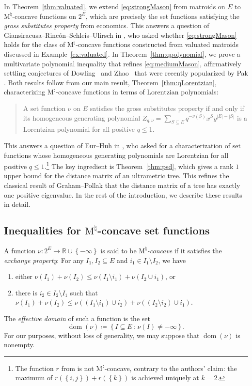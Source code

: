 \documentclass{amsart}
\theoremstyle{definition}
\theoremstyle{remark}
\newcommand{\abs}[1]{\left|#1\right|}               %
\newcommand{\set}[1]{\left\{#1\right\}}             %
\newcommand{\R}{\mathbb{R}}
\DeclareMathOperator{\dom}{{dom}}          %
\newcommand{\1}{\mathbf{1}}
\newcommand{\Mnat}{$\text{M}^\natural$}
\numberwithin{equation}{section}
\begin{document}
In Theorem~\ref{thm:valuated}, we extend \eqref{eq:strongMason} from matroids on $E$ to \Mnat-concave functions on $2^{E}$, which are precisely the set functions  
  satisfying the \emph{gross substitutes property} from economics. 
  This answers a question of  Giansiracusa--Rincón--Schleis--Ulirsch in \cite[Question 4.1]{GRSU24}, who asked whether \eqref{eq:strongMason} holds for the class of \Mnat-concave functions constructed from valuated matroids discussed in Example~\ref{ex:valuated}. 
  In Theorem~\ref{thm:qpolynomial},
  we prove a multivariate polynomial inequality that refines \eqref{eq:mediumMason}, affirmatively settling conjectures of Dowling~\cite{Do80} and Zhao~\cite{Zh85} that were recently popularized by Pak \cite{Pak24}.
Both results follow from our main result, Theorem~\ref{thm:qLorentzian}, characterizing \Mnat-concave functions in terms of Lorentzian polynomials:
\begin{quote}
A set function $\nu$ on $E$ satisfies the gross substitutes property if and only if its homogeneous generating polynomial $Z_{q,\nu} = \sum_{S \subseteq E} q^{-\nu(S)} x^S y^{\abs{E}-\abs{S}}$ is a Lorentzian polynomial for all positive $q \le 1$.
\end{quote}
This answers a question of Eur--Huh in \cite[Section 5.1]{EH20}, who asked for a characterization of set functions whose homogeneous generating polynomials are Lorentzian for all positive $q \le 1$.\footnote{The function $r$ from \cite[Example 5.4]{EH20} is  not \Mnat-concave, contrary to the authors' claim: the maximum of $r(\set{i,j})+r(\set{k})$ is achieved uniquely at $k=2$.}  
The key ingredient is Theorem~\ref{thm:psd}, which
gives a rank $1$ upper bound for the distance matrix of an ultrametric tree. This refines the classical result of Graham--Pollak that the distance matrix of a tree has exactly one positive eigenvalue.
In the rest of the introduction, we describe these results in detail.





\subsection{Inequalities for \Mnat-concave set functions}\label{sec:Mnat}

A  function $\nu \colon 2^{E} \to \R\cup\set{-\infty}$ is said to be \textit{\Mnat-concave} if it satisfies the \emph{exchange property}: For any $I_1, I_2 \subseteq E$ and $i_1 \in I_1\setminus I_2$, we have 
\begin{enumerate}[(1)]\itemsep 5pt
        \item either $\nu(I_1) + \nu(I_2) \leq \nu(I_1 \setminus i_1) +\nu(I_2 \cup i_1)$, or 
        \item there is $i_2\in I_2\setminus I_1$ such that $\nu(I_1)+\nu(I_2)\leq \nu((I_1\setminus i_1) \cup i_2)+\nu((I_2\setminus i_2) \cup i_1)$.
\end{enumerate}
The \emph{effective domain} of such a function is the set 
\[
\dom(\nu) \coloneqq \set{ I \subseteq {E} \, \colon \, \nu(I) \neq -\infty  }.
\]
For our purposes, without loss of generality, we may suppose that  $\dom(\nu)$ is nonempty.
\end{document}
